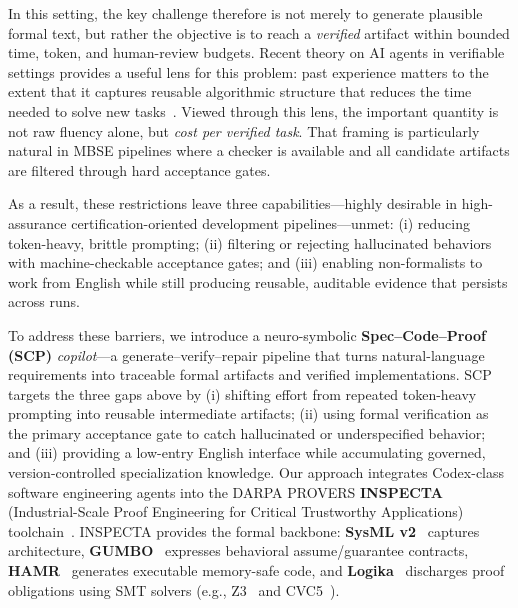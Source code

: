 \documentclass[conference]{IEEEtran}
\begin{document}
In this setting, the key challenge therefore is not merely to generate plausible formal text, but rather the objective is to reach a \emph{verified} artifact within bounded time, token, and human-review budgets. Recent theory on AI agents in verifiable settings provides a useful lens for this problem: past experience matters to the extent that it captures reusable algorithmic structure that reduces the time needed to solve new tasks~\cite{e28030332}. Viewed through this lens, the important quantity is not raw fluency alone, but \emph{cost per verified task}. That framing is particularly natural in MBSE pipelines where a checker is available and all candidate artifacts are filtered through hard acceptance gates.

As a result, these restrictions leave three capabilities—highly desirable in high-assurance certification-oriented development pipelines—unmet:
(i) reducing token-heavy, brittle prompting; (ii) filtering or rejecting hallucinated behaviors with machine-checkable acceptance gates; and (iii) enabling non-formalists to work from English while still producing reusable, auditable evidence that persists across runs.

To address these barriers, we introduce a neuro-symbolic \textbf{Spec--Code--Proof (SCP)} \emph{copilot}---a generate--verify--repair pipeline that turns natural-language requirements into traceable formal artifacts and verified implementations. SCP targets the three gaps above by (i) shifting effort from repeated token-heavy prompting into reusable intermediate artifacts; (ii) using formal verification as the primary acceptance gate to catch hallucinated or underspecified behavior; and (iii) providing a low-entry English interface while accumulating governed, version-controlled specialization knowledge. Our approach integrates Codex-class software engineering agents into the DARPA PROVERS \textbf{INSPECTA} (Industrial-Scale Proof Engineering for Critical Trustworthy Applications) toolchain~\cite{hardin2025dasc}. INSPECTA provides the formal backbone: \textbf{SysML v2}~\cite{sysmlv2_model_formalism_wg, sysmlv2_omg} captures architecture, \textbf{GUMBO}~\cite{gumbo, gumbo_galois} expresses behavioral assume/guarantee contracts, \textbf{HAMR}~\cite{hamr,HAMRsite} generates executable memory-safe code, and \textbf{Logika}~\cite{HAMRsite} discharges proof obligations using SMT solvers (e.g., Z3~\cite{Z3} and CVC5~\cite{Barrett2011CVC4}). %
\end{document}
